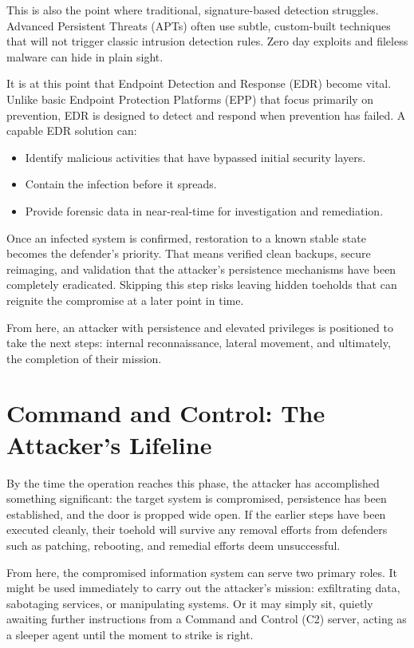 This is also the point where traditional, signature-based detection struggles. Advanced Persistent Threats (APTs) often use subtle, custom-built techniques that will not trigger classic intrusion detection rules. Zero day exploits and fileless malware can hide in plain sight.

It is at this point that Endpoint Detection and Response (EDR) become vital. Unlike basic Endpoint Protection Platforms (EPP) that focus primarily on prevention, EDR is designed to detect and respond when prevention has failed. A capable EDR solution can:
\begin{itemize}
    \item Identify malicious activities that have bypassed initial security layers.
    \item Contain the infection before it spreads.
    \item Provide forensic data in near-real-time for investigation and remediation.
\end{itemize}

Once an infected system is confirmed, restoration to a known stable state becomes the defender's priority. That means verified clean backups, secure reimaging, and validation that the attacker's persistence mechanisms have been completely eradicated. Skipping this step risks leaving hidden toeholds that can reignite the compromise at a later point in time.

From here, an attacker with persistence and elevated privileges is positioned to take the next steps: internal reconnaissance, lateral movement, and ultimately, the completion of their mission.

\section{Command and Control: The Attacker's Lifeline}
By the time the operation reaches this phase, the attacker has accomplished something significant: the target system is compromised, persistence has been established, and the door is propped wide open. If the earlier steps have been executed cleanly, their toehold will survive any removal efforts from defenders such as patching, rebooting, and remedial efforts deem unsuccessful.

From here, the compromised information system can serve two primary roles. It might be used immediately to carry out the attacker's mission: exfiltrating data, sabotaging services, or manipulating systems. Or it may simply sit, quietly awaiting further instructions from a Command and Control (C2) server, acting as a sleeper agent until the moment to strike is right.

